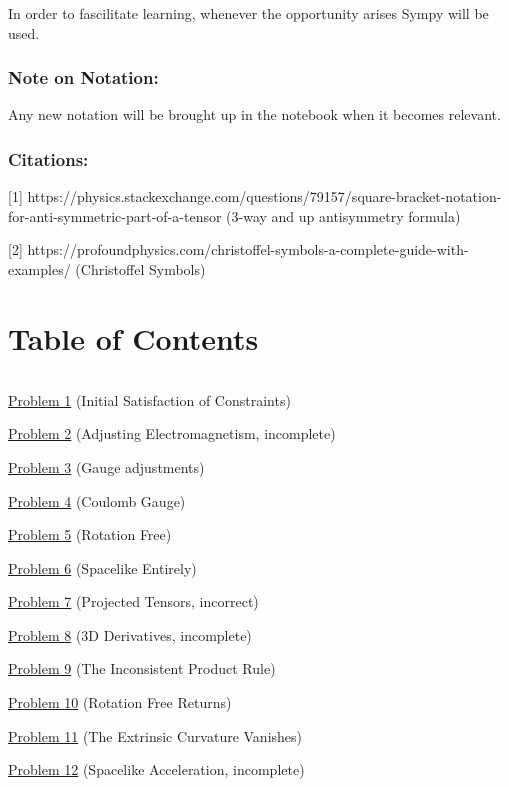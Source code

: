 \documentclass[landscape,letterpaper,10pt,english]{article}
\begin{document}
In order to fascilitate learning, whenever the opportunity arises Sympy
will be used.

\hypertarget{note-on-notation}{%
\subsubsection{Note on Notation:}\label{note-on-notation}}

Any new notation will be brought up in the notebook when it becomes
relevant.

\hypertarget{citations}{%
\subsubsection{Citations:}\label{citations}}

{[}1{]}
https://physics.stackexchange.com/questions/79157/square-bracket-notation-for-anti-symmetric-part-of-a-tensor
(3-way and up antisymmetry formula)

{[}2{]}
https://profoundphysics.com/christoffel-symbols-a-complete-guide-with-examples/
(Christoffel Symbols)

    \hypertarget{table-of-contents}{%
\section{Table of Contents}\label{table-of-contents}}

\[\label{toc}\]

\hyperref[p1]{Problem 1} (Initial Satisfaction of Constraints)

\hyperref[p2]{Problem 2} (Adjusting Electromagnetism, incomplete)

\hyperref[p3]{Problem 3} (Gauge adjustments)

\hyperref[p4]{Problem 4} (Coulomb Gauge)

\hyperref[p5]{Problem 5} (Rotation Free)

\hyperref[p6]{Problem 6} (Spacelike Entirely)

\hyperref[p7]{Problem 7} (Projected Tensors, incorrect)

\hyperref[p8]{Problem 8} (3D Derivatives, incomplete)

\hyperref[p9]{Problem 9} (The Inconsistent Product Rule)

\hyperref[p10]{Problem 10} (Rotation Free Returns)

\hyperref[p11]{Problem 11} (The Extrinsic Curvature Vanishes)

\hyperref[p12]{Problem 12} (Spacelike Acceleration, incomplete)
\end{document}
